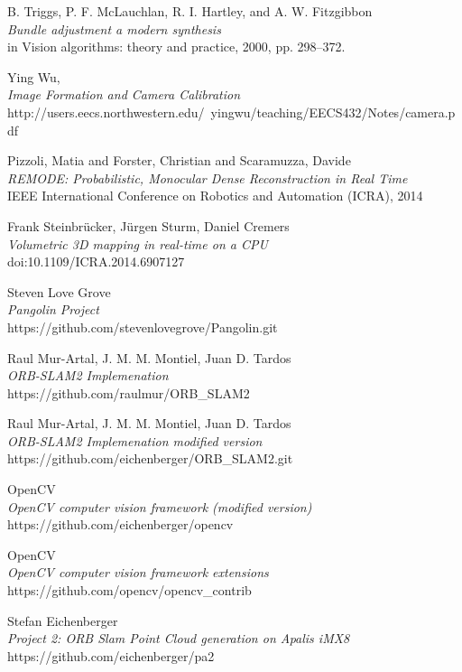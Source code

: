 \documentclass[11pt,a4paper,titlepage,oneside]{report}
\begin{document}
\begin{thebibliography}{1}
	B. Triggs, P. F. McLauchlan, R. I. Hartley, and A. W. Fitzgibbon\\
	\textit{Bundle adjustment a modern synthesis}\\
 	in Vision algorithms: theory and practice, 2000, pp. 298–372. 

	Ying Wu,\\
	\textit{Image Formation and Camera Calibration}\\
	http://users.eecs.northwestern.edu/~yingwu/teaching/EECS432/Notes/camera.pdf 

	Pizzoli, Matia and Forster, Christian and Scaramuzza, Davide\\
	\textit{REMODE: Probabilistic, Monocular Dense Reconstruction in Real Time}\\
	IEEE International Conference on Robotics and Automation (ICRA), 2014

	Frank Steinbrücker, Jürgen Sturm, Daniel Cremers\\
	\textit{Volumetric 3D mapping in real-time on a CPU}\\
	doi:10.1109/ICRA.2014.6907127

	Steven Love Grove\\
	\textit{Pangolin Project}\\
	https://github.com/stevenlovegrove/Pangolin.git

  Raul Mur-Artal, J. M. M. Montiel, Juan D. Tardos\\
  \textit{ORB-SLAM2 Implemenation}\\
	https://github.com/raulmur/ORB\_SLAM2

  Raul Mur-Artal, J. M. M. Montiel, Juan D. Tardos\\
  \textit{ORB-SLAM2 Implemenation modified version}\\
	https://github.com/eichenberger/ORB\_SLAM2.git

	OpenCV\\
	\textit{OpenCV computer vision framework (modified version)}\\
	https://github.com/eichenberger/opencv

	OpenCV\\
	\textit{OpenCV computer vision framework extensions}\\
	https://github.com/opencv/opencv\_contrib
	
	Stefan Eichenberger\\
	\textit{Project 2: ORB Slam Point Cloud generation on Apalis iMX8}\\
	https://github.com/eichenberger/pa2

\end{thebibliography}
\end{document}
